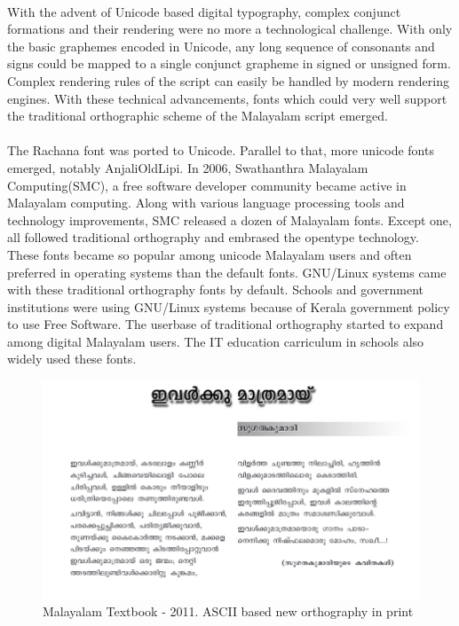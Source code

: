\documentclass[10pt]{article}
\begin{document}
\paragraph{}
With the advent of Unicode based digital typography, complex conjunct formations and their rendering were no more a technological challenge. With only the basic graphemes encoded in Unicode, any long sequence of consonants and signs could be mapped to a single conjunct grapheme in signed or unsigned form. Complex rendering rules of the script can easily be handled by modern rendering engines. With these technical advancements, fonts which could very well support the traditional orthographic scheme of the Malayalam script emerged. 

\paragraph{}
The Rachana font was ported to Unicode. Parallel to that, more unicode fonts emerged, notably AnjaliOldLipi. In 2006, Swathanthra Malayalam Computing(SMC), a free software developer community became active in Malayalam computing. Along with various language processing tools and technology improvements, SMC released a dozen of Malayalam fonts. Except one, all followed traditional orthography and embrased the opentype technology. These fonts became so popular among unicode Malayalam users and often preferred in operating systems than the default fonts. GNU/Linux systems came with these traditional orthography fonts by default. Schools and government institutions were using GNU/Linux systems because of Kerala government policy to use Free Software. The userbase of traditional orthography started to expand among digital Malayalam users. The IT education carriculum in schools also widely used these fonts.

\begin{figure}[H]
	\centering
	\includegraphics[scale=0.5]{images/2011-Malayalam-Textbook.png}
	\caption{Malayalam Textbook - 2011. ASCII based new orthography in print}
	\label{textbook2011}
\end{figure}
\end{document}
